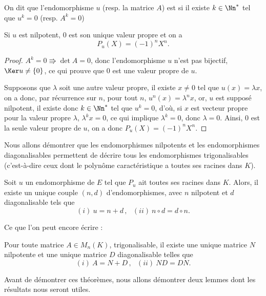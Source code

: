 \documentclass[class=report,crop=false]{standalone}
\begin{document}
\begin{definition}
On dit que l'endomorphisme $u$ (resp. la matrice $A$) 
est  si il existe $k\in\Nn^*$ tel
que $u^k=0$ (resp. $A^k=0$)
\end{definition} 


\begin{proposition}
Si $u$ est nilpotent, $0$ est son unique valeur propre et on a $$P_u(X)=(-1)^n X^n.$$
\end{proposition} 

\begin{proof}
$A^k=0\Rrightarrow \det A=0$, donc l'endomorphisme $u$ n'est pas bijectif, $\Ker u\neq \{0\}$, ce qui prouve que $0$ est une valeur propre de $u$.

Supposons que $\lambda$ soit une autre valeur propre, il existe $x\neq 0$ tel que $u(x)=\lambda x$, on a donc, par récurrence sur $n$, pour tout $n$, $u^n(x)=\lambda^n x$, or, $u$ est supposé nilpotent, il existe donc $k\in\Nn^*$ tel que $u^k=0$, d'où, si $x$ est vecteur propre pour la valeur propre $\lambda$, $\lambda^k x=0$, ce qui implique $\lambda^k=0$, donc $\lambda =0$. 
Ainsi, $0$ est la seule valeur propre de $u$, on a donc $P_u(X)=(-1)^nX^n$.
\end{proof}


Nous allons démontrer que les endomorphismes nilpotents et 
les endomorphismes diagonalisables permettent de décrire tous les 
endomorphismes trigonalisables (c'est-à-dire ceux dont le polynôme 
caractéristique a toutes ses racines dans $K$).



\begin{theoreme}
Soit $u$ un endomorphisme de $E$ tel que $P_u$ ait toutes ses racines dans $K$. Alors, il existe un
 unique couple $(n,d)$ d'endomorphismes, avec $n$ nilpotent et $d$ diagonalisable  tels que 
$$(i)\  u=n+d\,,\ \ \ (ii)\  n\circ d=d\circ n.$$
\end{theoreme}

Ce que l'on peut encore écrire :

\begin{theoreme}
Pour toute matrice $A\in M_n(K)$, trigonalisable, il existe une 
unique matrice $N$ nilpotente et une unique matrice $D$ diagonalisable telles que 
$$(i)\  A=N+D\,,\ \ \ (ii)\  ND=DN.$$
\end{theoreme} 
 
 
Avant de démontrer ces théorèmes, nous allons démontrer 
deux lemmes dont les résultats nous seront utiles.
\end{document}
